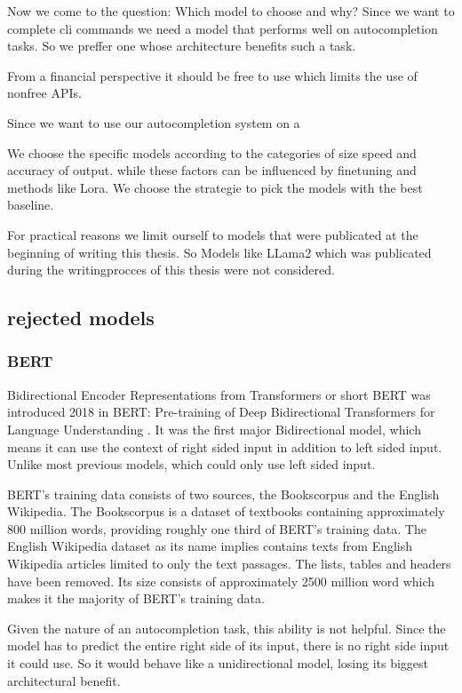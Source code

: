 Now  we come to the question: Which model to choose and why? 
Since we want to complete cli commands we need a model that performs well on autocompletion tasks. So we preffer one whose architecture benefits such a task.

From a financial perspective it should be free to use which limits the use of nonfree APIs.

Since we want to use our autocompletion system on a 







We choose the specific models according to the categories of size speed and accuracy of output. while these factors can be influenced by finetuning and methods like Lora. We choose the strategie to pick the models with the best baseline.

For practical reasons we limit ourself to models that were publicated at the beginning of writing this thesis. So Models like LLama2 which was publicated during the writingprocces of this thesis were not considered.


\subsection{rejected models}


\subsubsection{BERT}
Bidirectional Encoder Representations from Transformers or short BERT was introduced  2018  in BERT: Pre-training of Deep Bidirectional Transformers for
Language Understanding \cite{devlin2019bert}. It was the first major Bidirectional model, which means it can use the context of right sided input in addition to left sided input. Unlike most previous models, which could only use left sided input.

 
 BERT's training data consists of two sources, the Bookscorpus and the English Wikipedia. The Bookscorpus is a dataset of textbooks containing approximately 800 million words, providing roughly one third of BERT's training data. The English Wikipedia dataset as its name implies contains texts from English Wikipedia articles limited to only the text passages. The lists, tables and headers have been removed.
Its size consists of approximately 2500 million word which makes it the majority of BERT's training data. \cite{devlin2019bert}


 Given the nature of an autocompletion task, this ability is not helpful. Since the model has to predict the entire right side of its input, there is no right side input it could use. So it would behave like a unidirectional model, losing its biggest architectural benefit.
 

